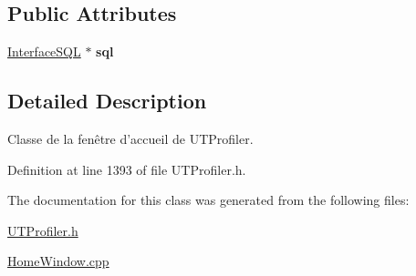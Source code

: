 \subsection*{Public Attributes}
\begin{DoxyCompactItemize}
\item 
\hypertarget{class_home_window_a89ddfafe9888e97fa39a62e798c38263}{\hyperlink{class_interface_s_q_l}{Interface\-S\-Q\-L} $\ast$ {\bfseries sql}}\label{class_home_window_a89ddfafe9888e97fa39a62e798c38263}

\end{DoxyCompactItemize}


\subsection{Detailed Description}
Classe de la fenêtre d'accueil de U\-T\-Profiler. 

Definition at line 1393 of file U\-T\-Profiler.\-h.



The documentation for this class was generated from the following files\-:\begin{DoxyCompactItemize}
\item 
\hyperlink{_u_t_profiler_8h}{U\-T\-Profiler.\-h}\item 
\hyperlink{_home_window_8cpp}{Home\-Window.\-cpp}\end{DoxyCompactItemize}
